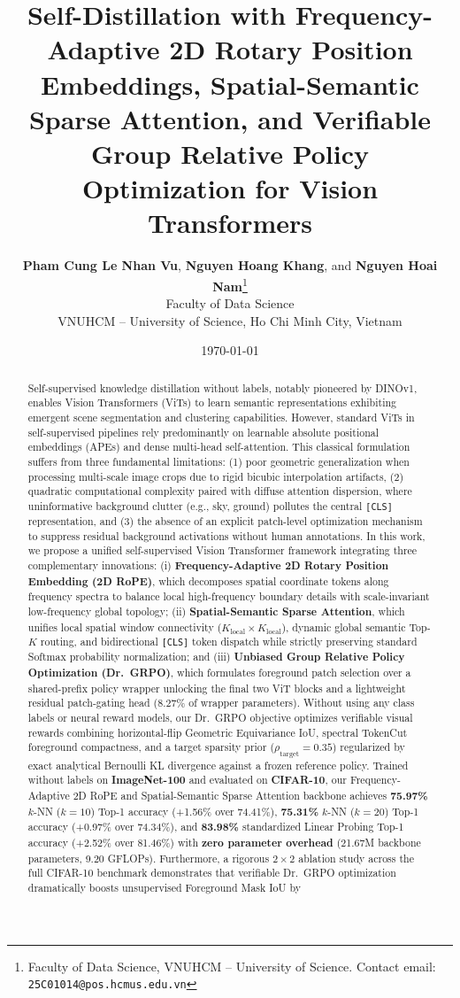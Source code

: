 \documentclass[11pt,a4paper]{article}
\title{\textbf{\Large Self-Distillation with Frequency-Adaptive 2D Rotary Position Embeddings, Spatial-Semantic Sparse Attention, and Verifiable Group Relative Policy Optimization for Vision Transformers}}
\author{
  \textbf{Pham Cung Le Nhan Vu}, \textbf{Nguyen Hoang Khang}, and \textbf{Nguyen Hoai Nam}\thanks{Faculty of Data Science, VNUHCM -- University of Science. Contact email: \texttt{25C01014@pos.hcmus.edu.vn}} \\[0.3em]
  Faculty of Data Science \\
  VNUHCM -- University of Science, Ho Chi Minh City, Vietnam
}
\date{\today}
\begin{document}
\maketitle

\begin{abstract}
Self-supervised knowledge distillation without labels, notably pioneered by DINOv1, enables Vision Transformers (ViTs) to learn semantic representations exhibiting emergent scene segmentation and clustering capabilities. However, standard ViTs in self-supervised pipelines rely predominantly on learnable absolute positional embeddings (APEs) and dense multi-head self-attention. This classical formulation suffers from three fundamental limitations: (1) poor geometric generalization when processing multi-scale image crops due to rigid bicubic interpolation artifacts, (2) quadratic computational complexity paired with diffuse attention dispersion, where uninformative background clutter (e.g., sky, ground) pollutes the central \texttt{[CLS]} representation, and (3) the absence of an explicit patch-level optimization mechanism to suppress residual background activations without human annotations. In this work, we propose a unified self-supervised Vision Transformer framework integrating three complementary innovations: (i) \textbf{Frequency-Adaptive 2D Rotary Position Embedding (2D RoPE)}, which decomposes spatial coordinate tokens along frequency spectra to balance local high-frequency boundary details with scale-invariant low-frequency global topology; (ii) \textbf{Spatial-Semantic Sparse Attention}, which unifies local spatial window connectivity ($K_{\text{local}} \times K_{\text{local}}$), dynamic global semantic Top-$K$ routing, and bidirectional \texttt{[CLS]} token dispatch while strictly preserving standard Softmax probability normalization; and (iii) \textbf{Unbiased Group Relative Policy Optimization (Dr.\ GRPO)}, which formulates foreground patch selection over a shared-prefix policy wrapper unlocking the final two ViT blocks and a lightweight residual patch-gating head ($8.27\%$ of wrapper parameters). Without using any class labels or neural reward models, our Dr.\ GRPO objective optimizes verifiable visual rewards combining horizontal-flip Geometric Equivariance IoU, spectral TokenCut foreground compactness, and a target sparsity prior ($\rho_{\text{target}}=0.35$) regularized by exact analytical Bernoulli KL divergence against a frozen reference policy. Trained without labels on \textbf{ImageNet-100} and evaluated on \textbf{CIFAR-10}, our Frequency-Adaptive 2D RoPE and Spatial-Semantic Sparse Attention backbone achieves \textbf{75.97\%} $k$-NN ($k=10$) Top-1 accuracy (+1.56\% over 74.41\%), \textbf{75.31\%} $k$-NN ($k=20$) Top-1 accuracy (+0.97\% over 74.34\%), and \textbf{83.98\%} standardized Linear Probing Top-1 accuracy (+2.52\% over 81.46\%) with \textbf{zero parameter overhead} (21.67M backbone parameters, 9.20 GFLOPs). Furthermore, a rigorous $2\times 2$ ablation study across the full CIFAR-10 benchmark demonstrates that verifiable Dr.\ GRPO optimization dramatically boosts unsupervised Foreground Mask IoU by 
\end{abstract}
\end{document}

